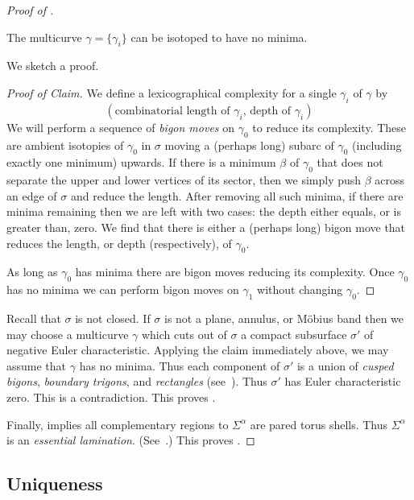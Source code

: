 \documentclass[12pt]{amsart}
\begin{document}
\begin{proof}[Proof of ]
\begin{claim*}
The multicurve $\gamma = \{\gamma_i\}$ can be isotoped to have no minima.
\end{claim*}
We sketch a proof.
\begin{proof}[Proof of Claim]
We define a lexicographical complexity for a single $\gamma_i$ of $\gamma$ by 
\[
( \mbox{combinatorial length of $\gamma_i$, depth of $\gamma_i$} )
\]
We will perform a sequence of \emph{bigon moves} on $\gamma_0$ to reduce its complexity.  These are ambient isotopies of $\gamma_0$ in $\sigma$ moving a (perhaps long) subarc of $\gamma_0$ (including exactly one minimum) upwards. 
If there is a minimum $\beta$ of $\gamma_0$ that does not separate the upper and lower vertices of its sector, then we simply push $\beta$ across an edge of $\sigma$ and reduce the length.  After removing all such minima, if there are minima remaining then we are left with two cases: the depth either equals, or is greater than, zero.  We find that there is either a (perhaps long) bigon move that reduces the length, or depth (respectively), of $\gamma_0$.

As long as $\gamma_0$ has minima there are bigon moves reducing its complexity.  Once $\gamma_0$ has no minima we can perform bigon moves on $\gamma_1$ without changing $\gamma_0$. 
\end{proof} 

Recall that $\sigma$ is not closed.  If $\sigma$ is not a plane, annulus, or M\"obius band then we may choose a multicurve $\gamma$ which cuts out of $\sigma$ a compact subsurface $\sigma'$ of negative Euler characteristic.  Applying the claim immediately above, we may assume that $\gamma$ has no minima.  Thus each component of $\sigma'$ is a union of \emph{cusped bigons}, \emph{boundary trigons}, and \emph{rectangles} (see~\cite{SchleimerSegerman19}).  Thus $\sigma'$ has Euler characteristic zero.  This is a contradiction.
This proves .

Finally,  implies all complementary regions to $\Sigma^\alpha$ are pared torus shells.  Thus $\Sigma^\alpha$ is an \emph{essential lamination}. 
(See~\cite[Definition~6.14]{Calegari07}.)  This proves .
\end{proof}

\subsection{Uniqueness}
\label{Sec:Uniqueness}
\end{document}
